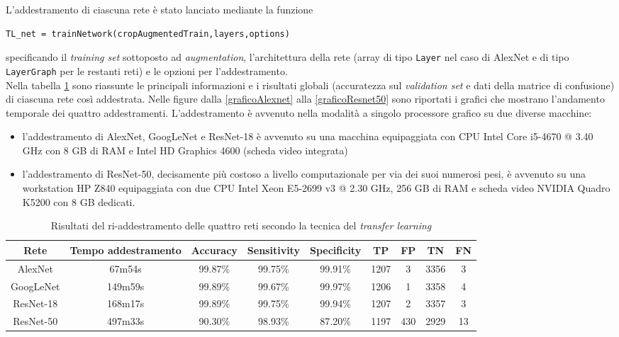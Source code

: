 \noindent L’addestramento di ciascuna rete è stato lanciato mediante la funzione
\begin{verbatim}
TL_net = trainNetwork(cropAugmentedTrain,layers,options)
\end{verbatim}
specificando il \textit{training set} sottoposto ad \textit{augmentation}, l’architettura della rete (array di tipo \verb|Layer| nel caso di AlexNet e di tipo \verb|LayerGraph| per le restanti reti) e le opzioni per l'addestramento.\\

\noindent Nella tabella \ref{prestazioniReti} sono riassunte le principali informazioni e i risultati globali (accuratezza sul \textit{validation set} e dati della matrice di confusione) di ciascuna rete così addestrata. Nelle figure dalla \ref{graficoAlexnet} alla \ref{graficoResnet50} sono riportati i grafici che mostrano l'andamento temporale dei quattro addestramenti.
L'addestramento è avvenuto nella modalità a singolo processore grafico su due diverse macchine:

\begin{itemize}

\item l'addestramento di AlexNet, GoogLeNet e ResNet-18 è avvenuto su una macchina equipaggiata con CPU Intel Core i5-4670 @ 3.40 GHz con 8 GB di RAM e Intel HD Graphics 4600 (scheda video integrata)

\item l'addestramento di ResNet-50, decisamente più costoso a livello computazionale per via dei suoi numerosi pesi, è avvenuto su una workstation HP Z840 equipaggiata con due CPU Intel Xeon E5-2699 v3 @ 2.30 GHz, 256 GB di RAM e scheda video NVIDIA Quadro K5200 con 8 GB dedicati.

\end{itemize}

\begin{table}[h]

  \centering
  \begin{adjustbox}{width=1\textwidth}
  \begin{tabular}{c c c c c c c c c}
  \hline
  Rete&Tempo addestramento&Accuracy&Sensitivity&Specificity&TP&FP&TN&FN\\
  \hline
  AlexNet&67m54s&99.87\%&99.75\%&99.91\%&1207&3&3356&3\\
  GoogLeNet&149m59s&99.89\%&99.67\%&99.97\%&1206&1&3358&4\\
  ResNet-18&168m17s&99.89\%&99.75\%&99.94\%&1207&2&3357&3\\
  ResNet-50&497m33s&90.30\%&98.93\%&87.20\%&1197&430&2929&13\\
  \hline
  \end{tabular}
  \end{adjustbox}
  
  \caption{Risultati del ri-addestramento delle quattro reti secondo la tecnica del \textit{transfer learning}}
  \label{prestazioniReti}

\end{table}

